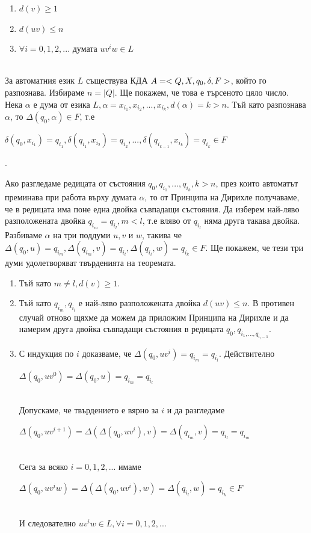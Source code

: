 \documentclass[11pt]{article} %
\begin{document}
\begin{enumerate}
	\item $d(v) \geq 1$\\
	\item $d(uv) \leq n$\\
	\item $\forall i = 0, 1, 2, ... $ думата $uv^{i}w \in L$\\
\end{enumerate}
\proof \\
За автоматния език $L$ съществува КДА $A = <Q, X, q_{0}, \delta, F>$, който го разпознава. Избираме $n = |Q|$. Ще покажем, че това е търсеното цяло число. Нека $\alpha$ е дума от езика $L, \alpha = x_{i_{1}}, x_{i_{2}}, ..., x_{i_{k}}, d(\alpha) = k > n$. Тъй като разпознава $\alpha$, то $\Delta(q_{0}, \alpha) \in F$, т.е \\
\centerline{$\delta(q_{0}, x_{i_{1}}) = q_{i_{1}}, \delta(q_{i_{1}}, x_{i_{2}}) = q_{i_{2}}, ..., \delta(q_{i_{k-1}}, x_{i_{k}}) = q_{i_{k}} \in F$}. \par

Ако разгледаме редицата от състояния $q_{0}, q_{i_{1}},...,q_{i_{k}}, k > n$, през които автоматът преминава при работа върху думата $\alpha$, то от Принципа на Дирихле получаваме, че в редицата има поне една двойка съвпадащи състояния. Да изберем най-ляво разположената двойка $q_{i_{m}} = q_{i_{l}}, m < l$, т.е вляво от $q_{i_{l}}$ няма друга такава двойка. Разбиваме $\alpha$ на три поддуми $u, v$ и $w$, такива че $\Delta(q_{0}, u) = q_{i_{m}}, \Delta(q_{i_{m}}, v) = q_{i_{l}}, \Delta(q_{i_{l}}, w) = q_{i_{k}} \in F$.
Ще покажем, че тези три думи удолетворяват твърденията на теоремата.

\renewcommand{\theenumi}{\arabic{enumi}}
\begin{enumerate}
	\item Тъй като $m \neq l, d(v) \geq 1$. \\
	\item Тъй като $q_{i_m}, q_{i_l}$ е най-ляво разположената двойка $d(uv) \leq n$. В противен случай отново щяхме да можем да приложим Принципа на Дирихле и да намерим друга двойка съвпадащи състояния в редицата $q_{0}, q_{i_{1},...,q_{i_l-1}}$.\\
	\item С индукция по $i$ доказваме, че $\Delta(q_{0}, uv^{i}) = q_{i_m} = q_{i_l}$. Действително \\
		\centerline{$\Delta(q_{0}, uv^{0}) = \Delta(q_{0}, u) = q_{i_m} = q_{i_l}$} \\
		Допускаме, че твърдението е вярно за $i$ и да разгледаме \\
		\centerline{$\Delta(q_{0}, uv^{i+1}) = \Delta(\Delta(q_{0}, uv^{i}), v) = \Delta(q_{i_m}, v) = q_{i_l} = q_{i_m}$}\\
		Сега за всяко $i = 0, 1, 2, ...$ имаме \\
		\centerline{$\Delta(q_{0}, uv^{i}w) = \Delta(\Delta(q_{0}, uv^{i}), w) = \Delta(q_{i_l}, w) = q_{i_k} \in F$} \\
		И следователно $uv^{i}w \in L, \forall i = 0,1,2,...$
\end{enumerate}   
\end{document}
